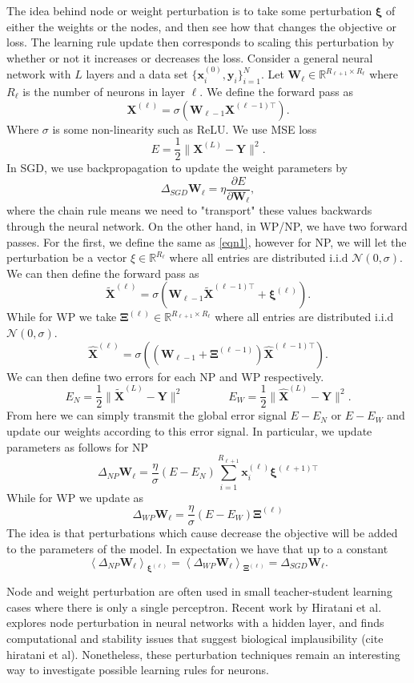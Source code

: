 \documentclass[11pt,letterpaper]{article}
\def\R{\mathbb{R}}
\def\*#1{\mathbf{#1}}
\begin{document}
The idea behind node or weight perturbation is to take some perturbation $\*\xi$ of either
the weights or the nodes, and then see how that changes the objective or loss. The learning rule update
then corresponds to scaling this perturbation by whether or not it increases or decreases
the loss. Consider a general neural network with $L$ layers and a data set $\{\*x_i^{(0)},\*y_i\}_{i=1}^N$. 
Let $\*W_{\ell} \in \R^{R_{\ell+1} \times R_{\ell}}$ where $R_\ell$ is the number of 
neurons in layer $\ell$. We define the forward pass as
\begin{equation}\label{eqn1}\*X^{(\ell)} = \sigma\left(\*W_{\ell-1} \*X^{(\ell-1)\top}\right).\end{equation}
Where $\sigma$ is some non-linearity such as ReLU. We use MSE loss 
\[E = \frac 12 \| \*X^{(L)}- \*Y\|^2.\]
In SGD, we use backpropagation to update the weight parameters by 
\[\Delta_{SGD} \* W_{\ell} = \eta\frac{\partial E}{\partial \*W_{\ell}},\] 
where the chain rule means we 
need to "transport" these values backwards through the neural network. On the other 
hand, in WP/NP, we have two forward passes. For the first, we define the same as \ref{eqn1}, 
however for NP, we will let the perturbation be a vector $\xi \in \R^{R_{\ell}}$ where all entries are distributed 
i.i.d $\mathcal{N}(0,\sigma)$. We can then define the forward pass as 
\[ \widetilde{\*X}^{(\ell)} = \sigma\left(\*W_{\ell -1} \widetilde{\*X}^{(\ell-1)\top} + \*\xi^{(\ell)} \right).\]
While for WP we take $\*\Xi^{(\ell)} \in \R^{R_{\ell + 1 }\times R_\ell}$ where all entries are distributed 
i.i.d $\mathcal{N}(0,\sigma)$. 
\[ \hat{\*X}^{(\ell)} = \sigma\left(\left(\*W_{\ell -1} + \*\Xi^{(\ell-1)}\right) \hat{\*X}^{(\ell-1)\top}  \right).\]
We can then define two errors for each NP and WP respectively.
\[ E_N = \frac 12 \| \widetilde{\* X}^{(L)} - \* Y \|^2 \qquad\qquad E_W = \frac 12 \| \hat{\* X}^{(L)} - \* Y \|^2. \]
From here we can simply transmit the global error signal $E-E_N$ or $E-E_W$ and update our weights according
to this error signal. In particular, we update parameters as follows for NP
\[ \Delta_{NP} \*W_{\ell} =\frac{\eta}{\sigma} (E-E_N) \sum_{i=1}^{R_{\ell+1}} \*x^{(\ell)}_i \* \xi^{(\ell+1)\top} \]
While for WP we update as
\[ \Delta_{WP} \*W_{\ell} = \frac{\eta}{\sigma} (E-E_W) \* \Xi^{(\ell)} \]
 The idea is that perturbations which cause decrease the objective will be added to 
 the parameters of the model. In expectation we have that up to a constant
\[ \left\langle \Delta_{NP}\*W_{\ell} \right\rangle_{\*\xi^{(\ell)}}= \left\langle \Delta_{WP}\*W_{\ell} \right\rangle_{\*\Xi^{(\ell)}} =  \Delta_{SGD}\*W_{\ell}.\]

 
 
Node and weight perturbation are often used in small teacher-student learning cases 
where there is only a single perceptron. Recent work by Hiratani et al. explores node perturbation
in neural networks with a hidden layer, and finds computational and stability issues that
suggest biological implausibility (cite hiratani et al). Nonetheless, these perturbation techniques remain an interesting way
to investigate possible learning rules for neurons. 
\end{document}
